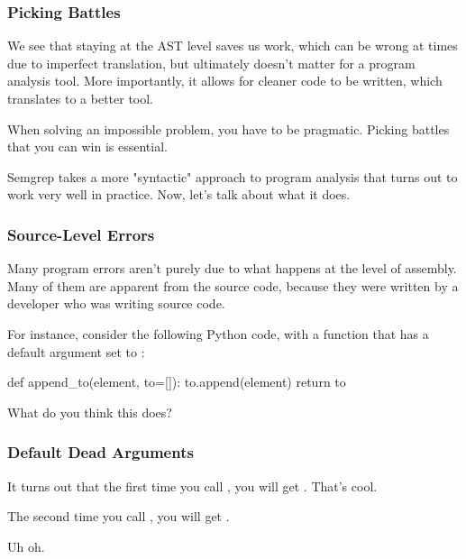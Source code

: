 \documentclass[aspectratio=169, handout]{beamer}
\begin{document}
\begin{frame}[fragile]
  \frametitle{Picking Battles}

  We see that staying at the AST level saves us work, which can be wrong at
  times due to imperfect translation, but ultimately doesn't matter for a
  program analysis tool. More importantly, it allows for cleaner code to
  be written, which translates to a better tool.

  \pause
  \vspace{\fill}

  When solving an impossible problem, you have to be pragmatic. Picking
  battles that you can win is essential.

  \pause
  \vspace{\fill}

  Semgrep takes a more "syntactic" approach to program analysis that turns
  out to work very well in practice. Now, let's talk about what it does.
\end{frame}

\begin{frame}[fragile]
  \frametitle{Source-Level Errors}

  Many program errors aren't purely due to what happens
  at the level of assembly. Many of them are apparent from the source code,
  because they were written by a developer who was writing source code.

  \pause
  \vspace{\fill}

  For instance, consider the following Python code, with a function that
  has a default argument  set to \code{[]}:
  \begin{pythoncodeblock}
    def append_to(element, to=[]):
      to.append(element)
      return to
  \end{pythoncodeblock}

  \vspace{\fill}
  \pause

  What do you think this does?
\end{frame}

\begin{frame}[fragile]
  \frametitle{Default Dead Arguments}

  It turns out that the first time you call , you will
  get \code{[2]}. That's cool.

  \pause
  \vspace{\fill}

  The second time you call , you will get \code{[2, 2]}.

  \pause
  \vspace{\fill}

  Uh oh.
\end{frame}
\end{document}
